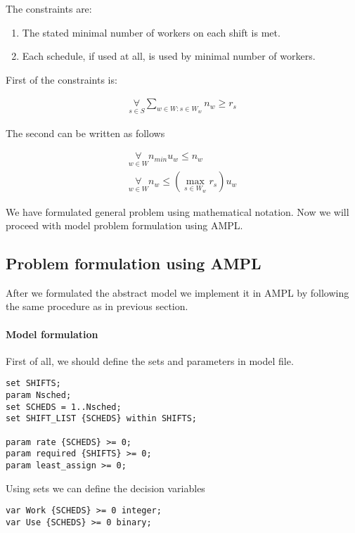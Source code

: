 The constraints are:

\begin{enumerate}
  \item The stated minimal number of workers on each shift is met.
  \item Each schedule, if used at all, is used by minimal number of workers.
\end{enumerate}

First of the constraints is: 

\begin{align}
   \mathop\forall\limits_{s \in S}
     \mathop\sum\limits_{w \in W: s \in W_w} n_w \geq r_s
\end{align}

The second can be written as follows

\begin{align}
   \mathop\forall\limits_{w \in W}
     n_{min} u_w \leq n_w \\
   \mathop\forall\limits_{w \in W}
     n_w \leq \left(\max\limits_{s \in W_w} r_s\right) u_w 
\end{align}

We have formulated general problem using mathematical notation. Now we will proceed with model problem formulation using AMPL.

\subsection{Problem formulation using AMPL}

After we formulated the abstract model we implement it in AMPL by following the same procedure as in previous section. 

\paragraph{Model formulation}

First of all, we should define the sets and parameters in model file.

\begin{lstlisting}
set SHIFTS;
param Nsched;
set SCHEDS = 1..Nsched;
set SHIFT_LIST {SCHEDS} within SHIFTS;

param rate {SCHEDS} >= 0;
param required {SHIFTS} >= 0;
param least_assign >= 0;
\end{lstlisting}

Using sets we can define the decision variables
\begin{lstlisting}
var Work {SCHEDS} >= 0 integer; 
var Use {SCHEDS} >= 0 binary;
\end{lstlisting}

